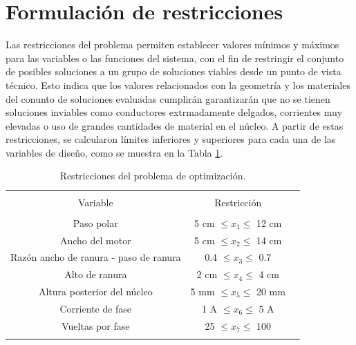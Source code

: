 \section{Formulación de restricciones}

Las restricciones del problema permiten establecer valores mínimos y máximos para las variables o las funciones del sistema, con el fin de restringir el conjunto de posibles soluciones a un grupo de soluciones viables desde un punto de vista técnico. Esto indica que los valores relacionados con la geometría y los materiales del conunto de soluciones evaluadas cumplirán garantizarán que no se tienen soluciones inviables como conductores extrmadamente delgados, corrientes muy elevadas o uso de grandes cantidades de material en el núcleo. A partir de estas restricciones, se calcularon límites inferiores y superiores para cada una de las variables de diseño, como se muestra en la Tabla \ref{table:restrictions}.

\begin{table}[!hb]
\centering
\caption{Restricciones del problema de optimización.}
\label{table:restrictions}
\begin{tabular}{c c c}
\hline\hline\\
Variable & Restricción\\
\hline\\
Paso polar & 5 cm $\leq x_1 \leq$ 12 cm\\
Ancho del motor & 5 cm $\leq x_2 \leq$ 14 cm\\
Razón ancho de ranura - paso de ranura & 0.4 $\leq x_3 \leq$ 0.7\\
Alto de ranura & 2 cm $\leq x_4 \leq$ 4 cm\\
Altura posterior del núcleo & 5 mm $\leq x_5 \leq$ 20 mm\\
Corriente de fase & 1 A $\leq x_6 \leq$ 5 A\\
Vueltas por fase & 25 $\leq x_7 \leq$ 100\\
\hline\hline\\
\end{tabular}
\end{table}

